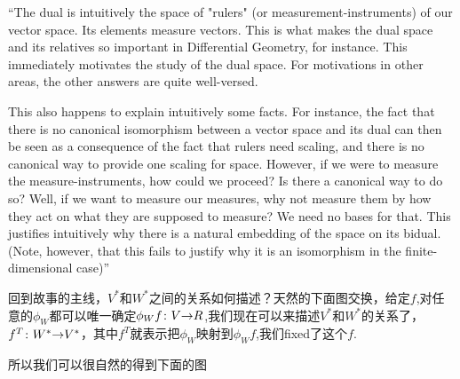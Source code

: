 \documentclass[UTF8,11pt,a4paper]{ctexart}%
\begin{document}
``The dual is intuitively the space of "rulers" (or measurement-instruments) of our vector space. Its elements measure vectors. This is what makes the dual space and its relatives so important in Differential Geometry, for instance. This immediately motivates the study of the dual space. For motivations in other areas, the other answers are quite well-versed.

This also happens to explain intuitively some facts. For instance, the fact that there is no canonical isomorphism between a vector space and its dual can then be seen as a consequence of the fact that rulers need scaling, and there is no canonical way to provide one scaling for space. However, if we were to measure the measure-instruments, how could we proceed? Is there a canonical way to do so? Well, if we want to measure our measures, why not measure them by how they act on what they are supposed to measure? We need no bases for that. This justifies intuitively why there is a natural embedding of the space on its bidual. (Note, however, that this fails to justify why it is an isomorphism in the finite-dimensional case)''



回到故事的主线，$V^{*}$和$W^{*}$之间的关系如何描述？天然的下面图交换，给定$f$,对任意的$\phi_{W}$都可以唯一确定${\phi_{W}f}\colon{V}{\to}{R}$,我们现在可以来描述$V^{*}$和$W^{*}$的关系了，${f^{T}}\colon{W^*}{\to}{V^*}$，其中$f^{T}$就表示把$\phi_{W}$映射到$\phi_{W}f$,我们fixed了这个$f$.

\begin{center}
\end{center}

所以我们可以很自然的得到下面的图

\begin{center}
\end{center}
\end{document}
